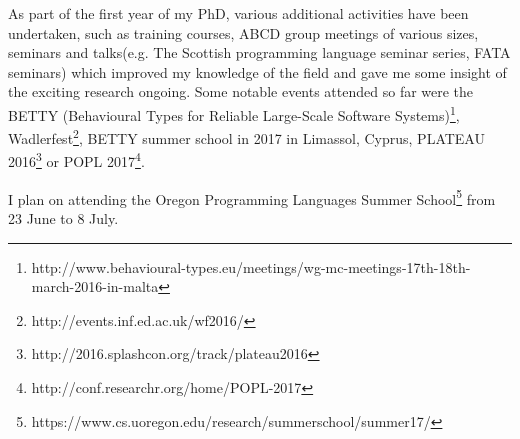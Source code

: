 As part of the first year of my PhD, various additional activities have been undertaken, such as training courses, ABCD group meetings of various sizes, seminars and talks(e.g. The Scottish programming language seminar series, FATA seminars) which improved my knowledge of the field and gave me some insight of the exciting research ongoing. Some notable events attended so far were the BETTY (Behavioural Types for Reliable Large-Scale Software Systems)\footnote{http://www.behavioural-types.eu/meetings/wg-mc-meetings-17th-18th-march-2016-in-malta}, Wadlerfest\footnote{http://events.inf.ed.ac.uk/wf2016/}, BETTY summer school in 2017 in Limassol, Cyprus, PLATEAU 2016\footnote{http://2016.splashcon.org/track/plateau2016} or POPL 2017\footnote{http://conf.researchr.org/home/POPL-2017}.

I plan on attending the Oregon Programming Languages Summer School\footnote{https://www.cs.uoregon.edu/research/summerschool/summer17/} from 23 June to 8 July.
